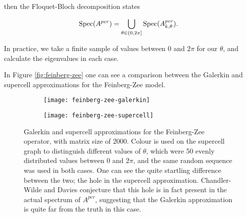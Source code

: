 \documentclass[../main.tex]{subfiles}
\begin{document}
then the Floquet-Bloch decomposition states 

$$\mathrm{Spec}(A^{per}) = \bigcup_{\theta \in (0, 2 \pi]} \mathrm{Spec}(A^{per}_{k, \theta}).$$

In practice, we take a finite sample of values between 0 and $2 \pi$ for our $\theta$, and calculate the eigenvalues in each case. 

In Figure \ref{fig:feinberg-zee} one can see a comparison between the Galerkin and supercell approximations for the Feinberg-Zee model. 

\begin{figure}[p!]\label{fig:feinberg-zee}
\centering
\begin{subfigure}{0.4\textwidth}
\texttt{[image: feinberg-zee-galerkin]}
\end{subfigure}
\begin{subfigure}{0.4\textwidth}
\texttt{[image: feinberg-zee-supercell]}
\end{subfigure}
\caption{Galerkin and supercell approximations for the Feinberg-Zee operator, with matrix size of 2000. Colour is used on the supercell graph to distinguish different values of $\theta$, which were 50 evenly distributed values between $0$ and $2 \pi$, and the same random sequence was used in both cases. One can see the quite startling difference between the two; the hole in the supercell approximation. Chandler-Wilde and Davies \cite{chandler-wilde2012spectrum} conjecture that this hole is in fact present in the actual spectrum of $A^{per}$, suggesting that the Galerkin approximation is quite far from the truth in this case.}
\end{figure}
\clearpage
\end{document}
